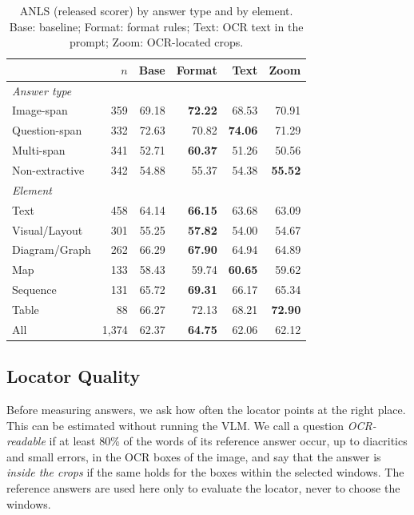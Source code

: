 \documentclass[conference]{IEEEtran}
\begin{document}
\begin{table}[t]
\caption{ANLS (released scorer) by answer type and by element. Base: baseline; Format: format rules; Text: OCR text in the prompt; Zoom: OCR-located crops.}
\label{tab:breakdown}
\centering
\begin{tabular}{lrrrrr}
\toprule
 & $n$ & Base & Format & Text & Zoom \\
\midrule
\multicolumn{6}{l}{\textit{Answer type}} \\
Image-span     & 359 & 69.18 & \textbf{72.22} & 68.53 & 70.91 \\
Question-span  & 332 & 72.63 & 70.82 & \textbf{74.06} & 71.29 \\
Multi-span     & 341 & 52.71 & \textbf{60.37} & 51.26 & 50.56 \\
Non-extractive & 342 & 54.88 & 55.37 & 54.38 & \textbf{55.52} \\
\midrule
\multicolumn{6}{l}{\textit{Element}} \\
Text           & 458 & 64.14 & \textbf{66.15} & 63.68 & 63.09 \\
Visual/Layout  & 301 & 55.25 & \textbf{57.82} & 54.00 & 54.67 \\
Diagram/Graph  & 262 & 66.29 & \textbf{67.90} & 64.94 & 64.89 \\
Map            & 133 & 58.43 & 59.74 & \textbf{60.65} & 59.62 \\
Sequence       & 131 & 65.72 & \textbf{69.31} & 66.17 & 65.34 \\
Table          &  88 & 66.27 & 72.13 & 68.21 & \textbf{72.90} \\
\midrule
All            & 1{,}374 & 62.37 & \textbf{64.75} & 62.06 & 62.12 \\
\bottomrule
\end{tabular}
\end{table}

\subsection{Locator Quality}
\label{sec:locator}
Before measuring answers, we ask how often the locator points at the right place. This can be estimated without running the VLM. We call a question \emph{OCR-readable} if at least 80\% of the words of its reference answer occur, up to diacritics and small errors, in the OCR boxes of the image, and say that the answer is \emph{inside the crops} if the same holds for the boxes within the selected windows. The reference answers are used here only to evaluate the locator, never to choose the windows.
\end{document}
